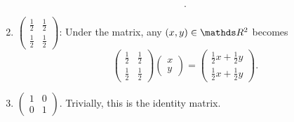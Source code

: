 \documentclass{review-sheet}
\begin{document}
\begin{solution}
\begin{enumerate}[label=(\alph*)]
\[      .\] 
    \item $\begin{pmatrix} \frac{1}{2}&\frac{1}{2} \\\frac{1}{2}&\frac{1}{2}\end{pmatrix} $: Under
      the matrix, any $(x,y)\in \R^2$ becomes \[
        \begin{pmatrix} \frac{1}{2}&\frac{1}{2}\\\frac{1}{2}&\frac{1}{2} \end{pmatrix}
        \begin{pmatrix} x\\y \end{pmatrix} =\begin{pmatrix}
      \frac{1}{2}x+\frac{1}{2}y\\\frac{1}{2}x+\frac{1}{2}y \end{pmatrix} 
      .\] 
    \item $ \begin{pmatrix} 1&0\\0&1 \end{pmatrix} $. Trivially, this is the identity matrix.
  \end{enumerate}
\end{solution}
\end{document}
